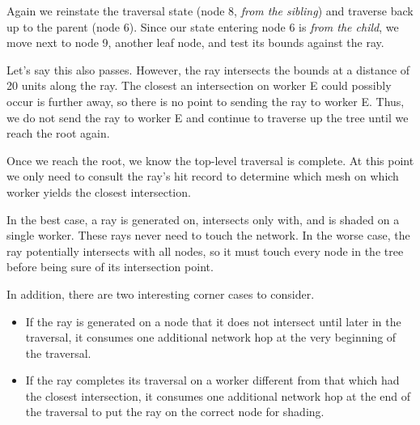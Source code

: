 \documentclass[a4paper,twoside]{article}
\begin{document}
Again we reinstate the traversal state (node 8, \emph{from the sibling}) and
traverse back up to the parent (node 6). Since our state entering node 6 is
\emph{from the child}, we move next to node 9, another leaf node, and test
its bounds against the ray.


Let's say this also passes. However, the ray intersects the bounds at a distance
of 20 units along the ray. The closest an intersection on worker E could
possibly occur is further away, so there is no point to sending the ray to
worker E. Thus, we do not send the ray to worker E and continue to traverse up
the tree until we reach the root again.



Once we reach the root, we know the top-level traversal is complete. At this
point we only need to consult the ray's hit record to determine which mesh on
which worker yields the closest intersection.

In the best case, a ray is generated on, intersects only with, and is shaded on
a single worker. These rays never need to touch the network. In the worse case,
the ray potentially intersects with all nodes, so it must touch every node in
the tree before being sure of its intersection point.

In addition, there are two interesting corner cases to consider.

\begin{itemize}
    \item If the ray is generated on a node that it does not intersect until
        later in the traversal, it consumes one additional network hop at the
        very beginning of the traversal.
    \item If the ray completes its traversal on a worker different from that
        which had the closest intersection, it consumes one additional network hop
        at the end of the traversal to put the ray on the correct node for
        shading.
\end{itemize}
\end{document}
